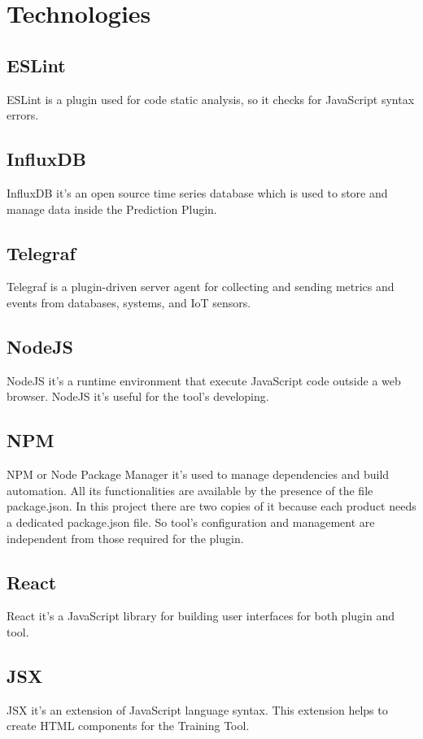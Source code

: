 \section{Technologies}
\subsection{ESLint}
ESLint is a plugin used for code static analysis, so it checks for JavaScript syntax errors.

\subsection{InfluxDB}
InfluxDB it's an open source time series database which is used to store and manage data inside the Prediction Plugin. 

\subsection{Telegraf}
Telegraf is a plugin-driven server agent for collecting and sending metrics and events from databases, systems, and IoT sensors.

\subsection{NodeJS}
NodeJS it's a runtime environment that execute JavaScript code outside a web browser. NodeJS it's useful for the tool's developing.

\subsection{NPM}
NPM or Node Package Manager it's used to manage dependencies and build automation. All its functionalities are available by the presence of the file package.json. In this project there are two copies of it because each product needs a dedicated package.json file. So tool's configuration and management are independent from those required for the plugin.

\subsection{React}
React it's a JavaScript library for building user interfaces for both plugin and tool.

\subsection{JSX}
JSX it's an extension of JavaScript language syntax. This extension helps to create HTML components for the Training Tool.

